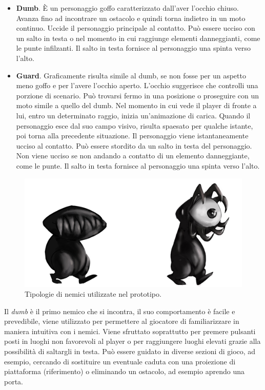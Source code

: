 \begin{itemize}
	\item \textbf{Dumb}. È un personaggio goffo caratterizzato dall’aver l’occhio chiuso. Avanza fino ad incontrare un ostacolo e quindi torna indietro in un moto continuo. Uccide il personaggio principale al contatto. Può essere ucciso con un salto in testa o nel momento in cui raggiunge elementi danneggianti, come le punte infilzanti. Il salto in testa fornisce al personaggio una spinta verso l’alto.
	\item \textbf{Guard}. Graficamente risulta simile al dumb, se non fosse per un aspetto meno goffo e per l’avere l’occhio aperto. L’occhio suggerisce che controlli una porzione di scenario. Può trovarsi fermo in una posizione o proseguire con un moto simile a quello del dumb. Nel momento in cui vede il player di fronte a lui, entro un determinato raggio, inizia un’animazione di carica. Quando il personaggio esce dal suo campo visivo, risulta spaesato per qualche istante, poi torna alla precedente situazione. Il personaggio viene istantaneamente ucciso al contatto. Può essere stordito da un salto in testa del personaggio. Non viene ucciso se non andando a contatto di un elemento danneggiante, come le punte. Il salto in testa fornisce al personaggio una spinta verso l’alto.
\end{itemize}

\begin{figure}%
	\centering
	\includegraphics[width= 0.8\columnwidth]{images/gameDesign/35_nemici.jpg}
	\caption{Tipologie di nemici utilizzate nel prototipo.}
	\label{fig:ambientazione_nemico_03}
\end{figure}

Il \textit{dumb} è il primo nemico che si incontra, il suo comportamento è facile e prevedibile, viene utilizzato per permettere al giocatore di familiarizzare in maniera intuitiva con i nemici. Viene sfruttato soprattutto per premere pulsanti posti in luoghi non favorevoli al player o per raggiungere luoghi elevati grazie alla possibilità di saltargli in testa. Può essere guidato in diverse sezioni di gioco, ad esempio, cercando di sostituire un eventuale caduta con una proiezione di piattaforma (riferimento) o eliminando un ostacolo, ad esempio aprendo una porta.

